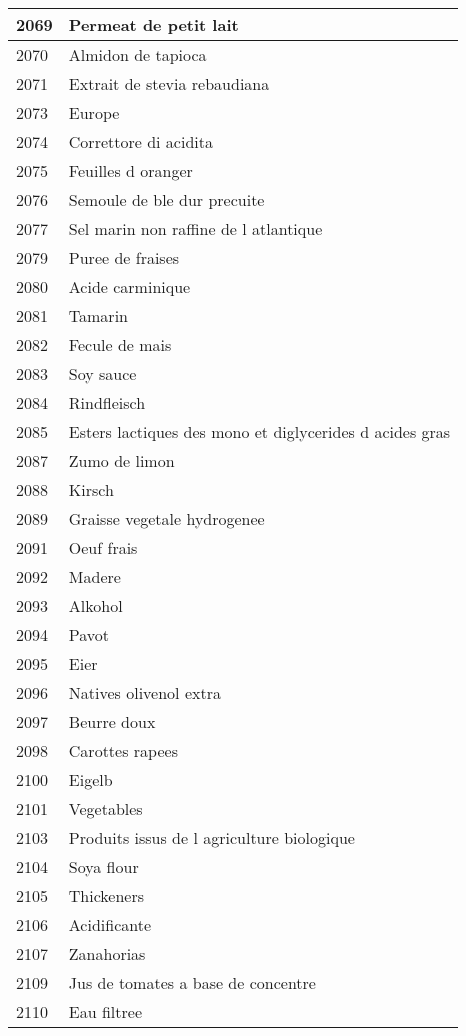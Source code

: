 \begin{longtable}{|l|l|}
2069 & Permeat de petit lait \\ \hline 
2070 & Almidon de tapioca \\ \hline 
2071 & Extrait de stevia rebaudiana \\ \hline 
2073 & Europe \\ \hline 
2074 & Correttore di acidita \\ \hline 
2075 & Feuilles d oranger \\ \hline 
2076 & Semoule de ble dur precuite \\ \hline 
2077 & Sel marin non raffine de l atlantique \\ \hline 
2079 & Puree de fraises \\ \hline 
2080 & Acide carminique \\ \hline 
2081 & Tamarin \\ \hline 
2082 & Fecule de mais \\ \hline 
2083 & Soy sauce \\ \hline 
2084 & Rindfleisch \\ \hline 
2085 & Esters lactiques des mono et diglycerides d acides gras \\ \hline 
2087 & Zumo de limon \\ \hline 
2088 & Kirsch \\ \hline 
2089 & Graisse vegetale hydrogenee \\ \hline 
2091 & Oeuf frais \\ \hline 
2092 & Madere \\ \hline 
2093 & Alkohol \\ \hline 
2094 & Pavot \\ \hline 
2095 & Eier \\ \hline 
2096 & Natives olivenol extra \\ \hline 
2097 & Beurre doux \\ \hline 
2098 & Carottes rapees \\ \hline 
2100 & Eigelb \\ \hline 
2101 & Vegetables \\ \hline 
2103 & Produits issus de l agriculture biologique \\ \hline 
2104 & Soya flour \\ \hline 
2105 & Thickeners \\ \hline 
2106 & Acidificante \\ \hline 
2107 & Zanahorias \\ \hline 
2109 & Jus de tomates a base de concentre \\ \hline 
2110 & Eau filtree \\ \hline 

\end{longtable}
